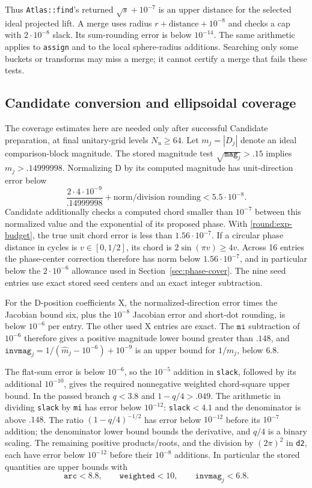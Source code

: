 Thus \texttt{Atlas::find}'s returned $\sqrt s+10^{-7}$ is an upper
distance for the selected ideal projected lift.  A merge uses radius
$r+\text{distance}+10^{-8}$ and checks a cap with $2\cdot10^{-8}$
slack.  Its sum-rounding error is below $10^{-14}$.
The same arithmetic applies to \texttt{assign} and to the local
sphere-radius additions.  Searching only some buckets or transforms
may miss a merge; it cannot certify a merge that fails these tests.

\subsection{Candidate conversion and ellipsoidal coverage}
\label{round:candidate}

The coverage estimates here are needed only after successful
Candidate preparation, at final unitary-grid levels $N_u\ge64$.
Let $m_j=|D_j|$ denote an ideal comparison-block magnitude.
The stored magnitude test $\sqrt{\texttt{mag}_j}>.15$ implies
$m_j>.14999998$.  Normalizing D by its computed magnitude has
unit-direction error below
\[
 \frac{2\cdot4\cdot10^{-9}}{.14999998}
      +\text{norm/division rounding}<5.5\cdot10^{-8}.
\]
Candidate additionally checks a computed chord smaller than
$10^{-7}$ between this normalized value and the exponential of its
proposed phase.  With \eqref{round:exp-budget}, the true unit chord
error is less than $1.56\cdot10^{-7}$.
If a circular phase distance in cycles is $v\in[0,1/2]$, its chord
is $2\sin(\pi v)\ge4v$.  Across 16 entries the phase-center
correction therefore has norm below $1.56\cdot10^{-7}$, and in
particular below the $2\cdot10^{-6}$ allowance used in
Section~\ref{sec:phase-cover}.  The nine seed entries use exact stored
seed centers and an exact integer subtraction.

For the D-position coefficients X, the normalized-direction error
times the Jacobian bound six, plus the $10^{-8}$ Jacobian error and
short-dot rounding, is below $10^{-6}$ per entry.  The other used
X entries are exact.  The $\mathtt{mi}$ subtraction of $10^{-6}$
therefore gives a positive magnitude lower bound greater than $.148$,
and
$\mathtt{invmag}_j=1/(\widehat m_j-10^{-6})+10^{-9}$
is an upper bound for $1/m_j$, below $6.8$.

The flat-sum error is below $10^{-6}$, so the $10^{-5}$ addition in
\texttt{slack}, followed by its additional $10^{-10}$, gives the
required nonnegative weighted chord-square upper bound.  In the
passed branch $q<3.8$ and $1-q/4>.049$.  The arithmetic in dividing
\texttt{slack} by \texttt{mi} has error below $10^{-12}$:
\texttt{slack}$<4.1$ and the denominator is above $.148$.
The ratio $(1-q/4)^{-1/2}$ has error below $10^{-12}$ before its
$10^{-7}$ addition; the denominator lower bound bounds the
derivative, and $q/4$ is a binary scaling.  The remaining positive
products/roots, and the division by $(2\pi)^2$ in \texttt{d2}, each
have error below $10^{-12}$ before their $10^{-8}$ additions.
In particular the stored quantities are upper bounds with
\begin{equation}\label{round:candidate-scales}
 \mathtt{arc}<8.8,\qquad \mathtt{weighted}<10,
 \qquad \mathtt{invmag}_j<6.8.
\end{equation}

